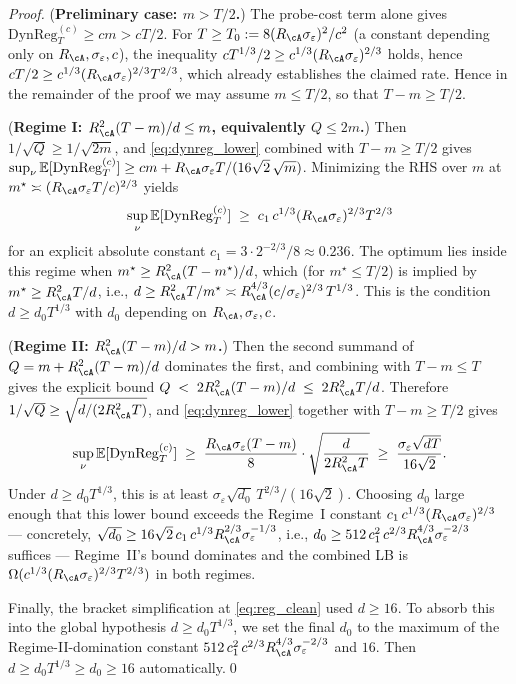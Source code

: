 \begin{proof}
\smallskip\noindent
(\textbf{Preliminary case: $m>T/2$.}) The probe-cost term alone gives
$\mathrm{DynReg}^{(c)}_T \ge cm > cT/2$. For
$T\ge T_0 := 8(R_\cA\sigma_\varepsilon)^{2}/c^{2}$ (a constant
depending only on $R_\cA,\sigma_\varepsilon,c$), the inequality
$cT^{1/3}/2 \ge c^{1/3}(R_\cA\sigma_\varepsilon)^{2/3}$ holds, hence
$cT/2\ge c^{1/3}(R_\cA\sigma_\varepsilon)^{2/3} T^{2/3}$, which already
establishes the claimed rate. Hence in the remainder of the proof we
may assume $m\le T/2$, so that $T-m\ge T/2$.

\smallskip\noindent
(\textbf{Regime I: $R_\cA^2(T-m)/d \le m$, equivalently $Q\le 2m$.})
Then $1/\sqrt{Q}\ge 1/\sqrt{2m}$, and \eqref{eq:dynreg_lower} combined
with $T-m\ge T/2$ gives
$\sup_\nu\mathbb E[\mathrm{DynReg}^{(c)}_T]\ge cm + R_\cA\sigma_\varepsilon T/(16\sqrt{2}\,\sqrt m)$.
Minimizing the RHS over $m$ at
$m^\star\asymp(R_\cA\sigma_\varepsilon T/c)^{2/3}$ yields
\[
\sup_\nu\mathbb E[\mathrm{DynReg}^{(c)}_T]
\;\ge\; c_1\,c^{1/3}(R_\cA\sigma_\varepsilon)^{2/3}T^{2/3}
\]
for an explicit absolute constant $c_1 = 3\cdot 2^{-2/3}/8\approx 0.236$.
The optimum lies inside this regime when
$m^\star\ge R_\cA^2(T-m^\star)/d$, which (for $m^\star\le T/2$) is
implied by $m^\star\ge R_\cA^2 T/d$, i.e., $d\ge R_\cA^2 T/m^\star
\asymp R_\cA^{4/3}(c/\sigma_\varepsilon)^{2/3}\,T^{1/3}$. This is the
condition $d\ge d_0 T^{1/3}$ with $d_0$ depending on
$R_\cA,\sigma_\varepsilon,c$.

\smallskip\noindent
(\textbf{Regime II: $R_\cA^2(T-m)/d > m$.})
Then the second summand of $Q = m + R_\cA^2(T-m)/d$ dominates the
first, and combining with $T-m\le T$ gives the explicit bound
$Q \;<\; 2R_\cA^2(T-m)/d \;\le\; 2R_\cA^2 T/d$.
Therefore $1/\sqrt{Q}\ge \sqrt{d/(2R_\cA^2 T)}$, and
\eqref{eq:dynreg_lower} together with $T-m\ge T/2$ gives
\[
\sup_\nu\mathbb E[\mathrm{DynReg}^{(c)}_T]
\;\ge\; \frac{R_\cA\sigma_\varepsilon (T-m)}{8}\cdot\sqrt{\frac{d}{2R_\cA^2 T}}
\;\ge\; \frac{\sigma_\varepsilon\sqrt{dT}}{16\sqrt 2}.
\]
Under $d\ge d_0 T^{1/3}$, this is at least
$\sigma_\varepsilon\sqrt{d_0}\,T^{2/3}/(16\sqrt 2)$. Choosing $d_0$ large
enough that this lower bound exceeds the Regime~I constant
$c_1\,c^{1/3}(R_\cA\sigma_\varepsilon)^{2/3}$ — concretely,
$\sqrt{d_0}\ge 16\sqrt 2\,c_1\,c^{1/3}R_\cA^{2/3}\sigma_\varepsilon^{-1/3}$,
i.e., $d_0\ge 512\,c_1^2\,c^{2/3}R_\cA^{4/3}\sigma_\varepsilon^{-2/3}$
suffices — Regime~II's bound dominates and the combined LB is
$\Omega(c^{1/3}(R_\cA\sigma_\varepsilon)^{2/3}T^{2/3})$ in both
regimes.

Finally, the bracket simplification at \eqref{eq:reg_clean} used
$d\ge 16$. To absorb this into the global hypothesis $d\ge d_0 T^{1/3}$,
we set the final $d_0$ to the maximum of the Regime-II-domination
constant $512\,c_1^2\,c^{2/3}R_\cA^{4/3}\sigma_\varepsilon^{-2/3}$ and
$16$. Then $d\ge d_0 T^{1/3}\ge d_0\ge 16$ automatically.\qed
\end{proof}

